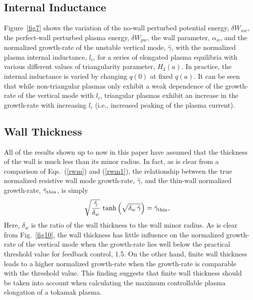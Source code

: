 \documentclass[12pt,prb,aps]{revtex4-1}
\begin{document}
\subsection{Internal Inductance}
Figure~\ref{fig7} shows the variation of the no-wall perturbed potential energy, $\delta W_{nw}$, the perfect-wall perturbed plasma energy, $\delta W_{pw}$, the wall 
parameter, $\alpha_w$, and the normalized growth-rate of the unstable vertical mode, $\hat{\gamma}$, with the normalized plasma internal inductance, $l_i$,   for a series of
elongated plasma equilibria with various different values of triangularity parameter, $H_3(a)$. In practice, the internal inductance is varied by changing $q(0)$ at
fixed $q(a)$. It can be seen that while non-triangular plasmas only exhibit a weak dependence of the growth-rate of the vertical mode with $l_i$, triangular
plasmas exhibit an increase in the growth-rate with increasing $l_i$ (i.e., increased peaking of the plasma current). 

\subsection{Wall Thickness}
All of the results shown up to now in this paper have assumed that the thickness of the wall is much less than its minor radius. In fact, as
is clear from a comparison of Eqs.~(\ref{rwm}) and (\ref{rwm1}), the relationship between the true normalized resistive wall mode growth-rate, $\hat{\gamma}$, and the
thin-wall normalized growth-rate, $\hat{\gamma}_{\rm thin}$, is simply
\begin{equation}
\sqrt{\frac{\hat{\gamma}}{\delta_w}}\,\tanh\left(\sqrt{\delta_w\,\hat{\gamma}}\right)= \hat{\gamma}_{\rm thin},
\end{equation}
Here, $\delta_w$ is the ratio of the wall thickness to the wall minor radius. As is clear from Fig.~\ref{fig10}, the wall thickness has little influence on the
normalized growth-rate of the vertical mode when the growth-rate lies well below the practical threshold value for feedback control, 1.5. On the other
hand, finite wall thickness leads to a higher normalized growth-rate when the growth-rate is comparable with the threshold value. This finding
suggests that finite wall thickness should be taken into account when calculating the maximum controllable plasma elongation of a tokamak plasma. 
\end{document}
